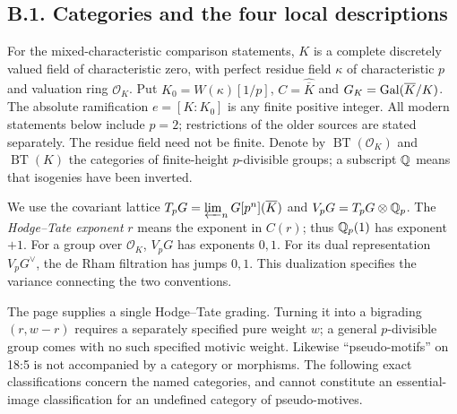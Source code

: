 \subsection{B.1. Categories and the four local descriptions}

For the mixed-characteristic comparison statements, $K$ is a complete
discretely valued field of characteristic zero, with perfect residue
field $\kappa$ of characteristic $p$ and valuation ring $\mathcal O_K$.
Put $K_0=W(\kappa)[1/p]$, $C=\widehat{\overline K}$ and
$G_K=\operatorname{Gal}(\overline K/K)$. The absolute ramification
$e=[K:K_0]$ is any finite positive integer. All modern statements below
include $p=2$; restrictions of the older sources are stated separately.
The residue field need not be finite. Denote by
$\operatorname{BT}(\mathcal O_K)$ and $\operatorname{BT}(K)$ the
categories of finite-height $p$-divisible groups; a subscript $\mathbb Q$
means that isogenies have been inverted.

We use the covariant lattice
$T_pG=\varprojlim_nG[p^n](\overline K)$ and
$V_pG=T_pG\otimes\mathbb Q_p$. The \emph{Hodge--Tate exponent} $r$ means
the exponent in $C(r)$; thus $\mathbb Q_p(1)$ has exponent $+1$.
For a group over $\mathcal O_K$, $V_pG$ has exponents $0,1$.
For its dual representation $V_pG^\vee$, the de Rham filtration has
jumps $0,1$. This dualization specifies the variance connecting the
two conventions.

The page supplies a single Hodge--Tate grading. Turning it into a
bigrading $(r,w-r)$ requires a separately specified pure weight $w$;
a general $p$-divisible group comes with no such specified motivic
weight. Likewise ``pseudo-motifs'' on 18:5 is not accompanied by a
category or morphisms. The following exact classifications concern
the named categories, and cannot constitute an essential-image
classification for an undefined category of pseudo-motives.

